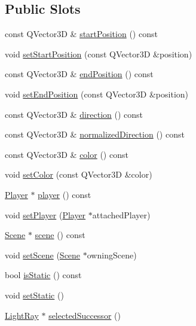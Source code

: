 \subsection*{Public Slots}
\begin{DoxyCompactItemize}
\item 
const Q\+Vector3\+D \& \hyperlink{class_light_ray_a70d3d18bbecdf54dc399df5112ca024a}{start\+Position} () const 
\item 
void \hyperlink{class_light_ray_a1db98f630b5a18bb297936fc5c8f25fb}{set\+Start\+Position} (const Q\+Vector3\+D \&position)
\item 
const Q\+Vector3\+D \& \hyperlink{class_light_ray_a13026c9fc18cf7fc2d53832223172f13}{end\+Position} () const 
\item 
void \hyperlink{class_light_ray_a5b9d55f5a6bed4b610f1bc294905dd64}{set\+End\+Position} (const Q\+Vector3\+D \&position)
\item 
const Q\+Vector3\+D \& \hyperlink{class_light_ray_af2c247c9b2cc33b4b18ead8e1b12c697}{direction} () const 
\item 
const Q\+Vector3\+D \& \hyperlink{class_light_ray_a1a0dfa514a6c350b78e20903d2fde5c4}{normalized\+Direction} () const 
\item 
const Q\+Vector3\+D \& \hyperlink{class_light_ray_ae816ba62186298d8900e4617034d1d66}{color} () const 
\item 
void \hyperlink{class_light_ray_a607addd328ae2b935d21e093ae15bcd4}{set\+Color} (const Q\+Vector3\+D \&color)
\item 
\hyperlink{class_player}{Player} $\ast$ \hyperlink{class_light_ray_ab2e0d1d08c23a451b83907d61af4297a}{player} () const 
\item 
void \hyperlink{class_light_ray_a3720775f0e8d6c5a8041fd6a7b371dad}{set\+Player} (\hyperlink{class_player}{Player} $\ast$attached\+Player)
\item 
\hyperlink{class_scene}{Scene} $\ast$ \hyperlink{class_light_ray_a7ad5ff6f8863759c2183c95ba8914dfc}{scene} () const 
\item 
void \hyperlink{class_light_ray_a82577f82a77e84b81bd1b722a00bde54}{set\+Scene} (\hyperlink{class_scene}{Scene} $\ast$owning\+Scene)
\item 
bool \hyperlink{class_light_ray_a86e10593e7c2e3a4bbbbf817dd774c27}{is\+Static} () const 
\item 
void \hyperlink{class_light_ray_a6694333616a4d172f1c1bcb4ccbe1587}{set\+Static} ()
\item 
\hyperlink{class_light_ray}{Light\+Ray} $\ast$ \hyperlink{class_light_ray_ad7a12f31f9f84adc155211009a677d77}{selected\+Successor} ()

\end{DoxyCompactItemize}
